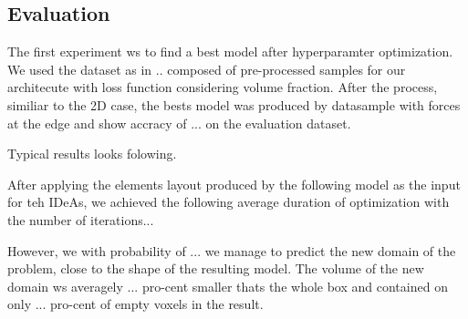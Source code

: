 \subsection{Evaluation}

The first experiment ws to find a best model after hyperparamter optimization.
We used the dataset as in .. composed of pre-processed samples for our architecute with loss function considering volume fraction.
After the process, similiar to the 2D case, the bests model was produced by datasample with forces at the edge and show accracy of ... on the evaluation dataset. 

Typical results looks folowing.

After applying the elements layout produced by the following model as the input for teh IDeAs, we achieved the following average duration of optimization with the number of iterations...

However, we with probability of ... we manage to predict the new domain of the problem, close to the shape of the resulting model. 
The volume of the  new domain ws averagely ... pro-cent smaller thats the whole box and contained on only ... pro-cent of empty voxels in the result.
 


